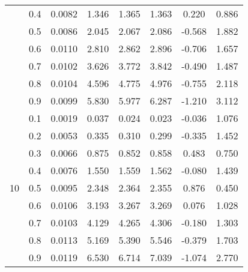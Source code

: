 \documentclass[11pt,a4paper]{report}
\begin{document}
\begin{longtable}{ | c | c || c | c | c | c | c | c | }
 & 0.4 & 0.0082 & 1.346 & 1.365 & 1.363 & 0.220 & 0.886 \\
 & 0.5 & 0.0086 & 2.045 & 2.067 & 2.086 & -0.568 & 1.882 \\
 & 0.6 & 0.0110 & 2.810 & 2.862 & 2.896 & -0.706 & 1.657 \\
 & 0.7 & 0.0102 & 3.626 & 3.772 & 3.842 & -0.490 & 1.487 \\
 & 0.8 & 0.0104 & 4.596 & 4.775 & 4.976 & -0.755 & 2.118 \\
 & 0.9 & 0.0099 & 5.830 & 5.977 & 6.287 & -1.210 & 3.112 \\
 \hline
\multirow{9}{*}{10} & 0.1 & 0.0019 & 0.037 & 0.024 & 0.023 & -0.036 & 1.076 \\
 & 0.2 & 0.0053 & 0.335 & 0.310 & 0.299 & -0.335 & 1.452 \\
 & 0.3 & 0.0066 & 0.875 & 0.852 & 0.858 & 0.483 & 0.750 \\
 & 0.4 & 0.0076 & 1.550 & 1.559 & 1.562 & -0.080 & 1.439 \\
 & 0.5 & 0.0095 & 2.348 & 2.364 & 2.355 & 0.876 & 0.450 \\
 & 0.6 & 0.0106 & 3.193 & 3.267 & 3.269 & 0.076 & 1.028 \\
 & 0.7 & 0.0103 & 4.129 & 4.265 & 4.306 & -0.180 & 1.303 \\
 & 0.8 & 0.0113 & 5.169 & 5.390 & 5.546 & -0.379 & 1.703 \\
 & 0.9 & 0.0119 & 6.530 & 6.714 & 7.039 & -1.074 & 2.770 \\
 \hline
\hline
\end{longtable}
\end{document}
